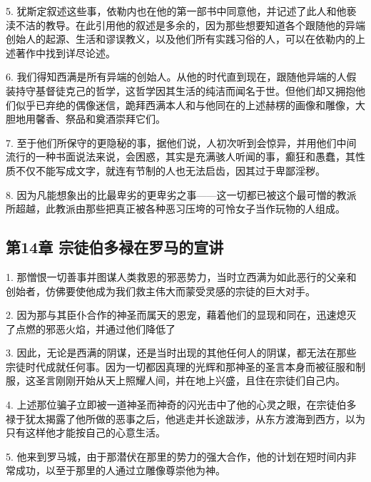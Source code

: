5. 犹斯定叙述这些事，依勒内也在他的第一部书中同意他，并记述了此人和他亵渎不洁的教导。在此引用他的叙述是多余的，因为那些想要知道各个跟随他的异端创始人的起源、生活和谬误教义，以及他们所有实践习俗的人，可以在依勒内的上述著作中找到详尽论述。\par

6. 我们得知西满是所有异端的创始人。从他的时代直到现在，跟随他异端的人假装持守基督徒克己的哲学，这哲学因其生活的纯洁而闻名于世。但他们却又拥抱他们似乎已弃绝的偶像迷信，跪拜西满本人和与他同在的上述赫楞的画像和雕像，大胆地用馨香、祭品和奠酒崇拜它们。\par

7. 至于他们所保守的更隐秘的事，据他们说，人初次听到会惊异，并用他们中间流行的一种书面说法来说，会困惑，其实是充满骇人听闻的事，癫狂和愚蠢，其性质不仅不能写成文字，就连有节制的人也无法启齿，因其过于卑鄙淫秽。\par

8. 因为凡能想象出的比最卑劣的更卑劣之事——这一切都已被这个最可憎的教派所超越，此教派由那些把真正被各种恶习压垮的可怜女子当作玩物的人组成。\par


\subsection{第14章 宗徒伯多禄在罗马的宣讲}

1. 那憎恨一切善事并图谋人类救恩的邪恶势力，当时立西满为如此恶行的父亲和创始者，仿佛要使他成为我们救主伟大而蒙受灵感的宗徒的巨大对手。\par

2. 因为那与其臣仆合作的神圣而属天的恩宠，藉着他们的显现和同在，迅速熄灭了点燃的邪恶火焰，并通过他们降低了 \par

3. 因此，无论是西满的阴谋，还是当时出现的其他任何人的阴谋，都无法在那些宗徒时代成就任何事。因为一切都因真理的光辉和那神圣的圣言本身而被征服和制服，这圣言刚刚开始从天上照耀人间，并在地上兴盛，且住在宗徒们自己内。\par

4. 上述那位骗子立即被一道神圣而神奇的闪光击中了他的心灵之眼，在宗徒伯多禄于犹太揭露了他所做的恶事之后，他逃走并长途跋涉，从东方渡海到西方，以为只有这样他才能按自己的心意生活。\par

5. 他来到罗马城，由于那潜伏在那里的势力的强大合作，他的计划在短时间内非常成功，以至于那里的人通过立雕像尊崇他为神。\par

